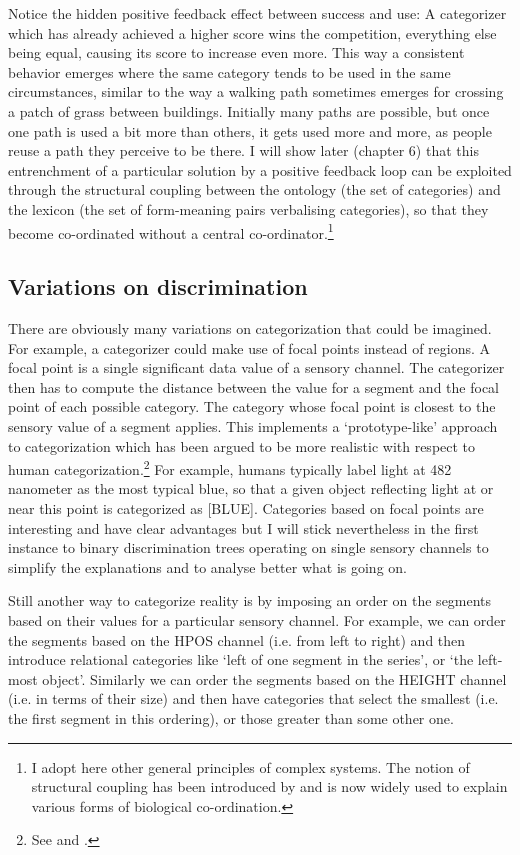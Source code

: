 Notice the hidden positive feedback effect between success
and use: A categorizer which has already achieved
a higher score wins the competition, everything else being
equal, causing its score to increase even more. 
This way a consistent behavior emerges where the 
same category tends to be used in the same circumstances, 
similar to the way a walking path sometimes 
emerges for crossing a patch of grass between buildings. 
Initially many paths are possible, but once one path 
is used a bit more than others, it gets used more and 
more, as people reuse a path they perceive to be
there. I will show later (chapter 6) that this entrenchment of 
a particular solution by a positive feedback loop can 
be exploited through the structural coupling between 
the ontology (the set of categories) and the lexicon
(the set of form-meaning pairs verbalising categories), 
so that they become co-ordinated without a central 
co-ordinator.\footnote{
I adopt here other general principles of complex
systems. The notion of structural coupling has been 
introduced by \cite{Maturana:1992} and is 
now widely used to explain various forms of 
biological co-ordination.}

\subsection{Variations on discrimination}

There are obviously many variations on categorization
that could be imagined. For example, a categorizer
could make use of focal points instead of regions. A focal 
point is a single significant data value of a sensory channel.
The categorizer then has to compute the distance 
between the value for a segment and the focal point 
of each possible category. The category 
whose focal point is closest to the sensory value
of a segment applies. This implements a `prototype-like'
approach to categorization which has been argued to 
be more realistic with respect to human categorization.\footnote{
See \cite{Varela:1991} and \cite{Taylor:1989}.}
For example, humans typically label light
at 482 nanometer as the most typical blue, so that a given object
reflecting light at or near this point is categorized
as [BLUE]. Categories based on focal points are 
interesting and have clear advantages 
but I will stick nevertheless in the first instance 
to binary discrimination trees operating on single sensory 
channels to simplify the explanations
and to analyse better what is going on. 

Still another way to categorize reality is by imposing 
an order on the segments based on their values for 
a particular sensory channel. For example, we can 
order the segments based on the HPOS channel (i.e. 
from left to right) and then introduce relational categories
like `left of one segment in the series', or `the left-most object'. 
Similarly we can order the segments based on the 
HEIGHT channel (i.e. in terms of their size) and then 
have categories that select the smallest (i.e. the 
first segment in this ordering), or those greater than 
some other one. 

